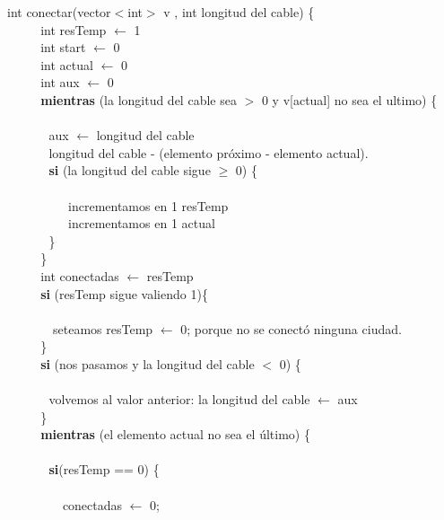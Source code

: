 int conectar(vector$<$int$>$ v , int longitud del cable) \{ \\
$~~~~~~~~~~~~$int resTemp $\leftarrow$ 1 \\
$~~~~~~~~~~~~$int start $\leftarrow$ 0 \\
$~~~~~~~~~~~~$int actual $\leftarrow$ 0 \\
$~~~~~~~~~~~~$int aux $\leftarrow$ 0 \\
$~~~~~~~~~~~~$\textbf{mientras} (la longitud del cable sea $>$ 0 y v[actual] no sea el ultimo) \{ \\  \\
$~~~~~~~~~~~~~~~$aux  $\leftarrow$ longitud del cable \\
$~~~~~~~~~~~~~~~$longitud del cable - (elemento próximo - elemento actual).\\
$~~~~~~~~~~~~~~~$\textbf{si} (la longitud del cable sigue $\geq$ 0) \{ \\ \\
$~~~~~~~~~~~~~~~~~~~~~~$incrementamos en 1 resTemp\\
$~~~~~~~~~~~~~~~~~~~~~~$incrementamos en 1 actual\\
$~~~~~~~~~~~~~~~$\} \\ 
$~~~~~~~~~~~~$\} \\ 
$~~~~~~~~~~~~$int conectadas $\leftarrow$ resTemp \\
$~~~~~~~~~~~~$\textbf{si} (resTemp sigue valiendo 1)\{ \\ \\
$~~~~~~~~~~~~~~~$ seteamos resTemp $\leftarrow$ 0; porque no se conectó ninguna ciudad. \\
$~~~~~~~~~~~~$\} \\ 
$~~~~~~~~~~~~$\textbf{si} (nos pasamos y la longitud del cable $<$ 0) \{ \\   \\
$~~~~~~~~~~~~~~~$volvemos al valor anterior: la longitud del cable $\leftarrow$ aux\\
$~~~~~~~~~~~~$\} \\ 
$~~~~~~~~~~~~$\textbf{mientras} (el elemento actual no sea el último) \{  \\  \\
$~~~~~~~~~~~~~~~$\textbf{si}(resTemp == 0) \{ \\  \\
$~~~~~~~~~~~~~~~~~~~~$conectadas  $\leftarrow$ 0; \\
